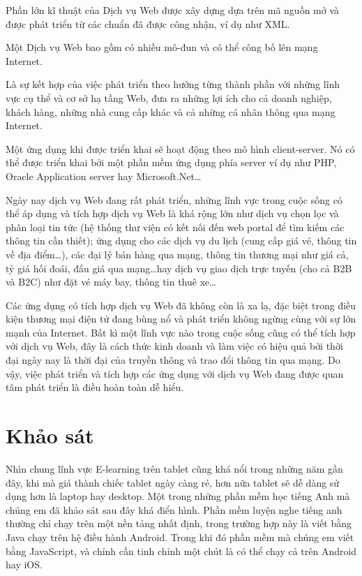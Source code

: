 Phần lớn kĩ thuật của Dịch vụ Web được xây dựng dựa trên mã nguồn mở và được phát triển từ các chuẩn đã được công nhận, ví dụ như XML.

Một Dịch vụ Web bao gồm có nhiều mô-đun và có thể công bố lên mạng Internet.

Là sự kết hợp của việc phát triển theo hướng từng thành phần với những lĩnh vực cụ thể và cơ sở hạ tầng Web, đưa ra những lợi ích cho cả doanh nghiệp, khách hàng, những nhà cung cấp khác và cả những cá nhân thông qua mạng Internet.

Một ứng dụng khi được triển khai sẽ hoạt động theo mô hình client-server. Nó có thể được triển khai bởi một phần mềm ứng dụng phía server ví dụ như PHP, Oracle Application server hay Microsoft.Net…

Ngày nay dịch vụ Web đang rất phát triển, những lĩnh vực trong cuộc sống có thể áp dụng và tích hợp dịch vụ Web là khá rộng lớn như dịch vụ chọn lọc và phân loại tin tức (hệ thống thư viện có kết nối đến web portal để tìm kiếm các thông tin cần thiết); ứng dụng cho các dịch vụ du lịch (cung cấp giá vé, thông tin về địa điểm…), các đại lý bán hàng qua mạng, thông tin thương mại như giá cả, tỷ giá hối đoái, đấu giá qua mạng…hay dịch vụ giao dịch trực tuyến (cho cả B2B và B2C) như đặt vé máy bay, thông tin thuê xe…

Các ứng dụng có tích hợp dịch vụ Web đã không còn là xa lạ, đặc biệt trong điều kiện thương mại điện tử đang bùng nổ và phát triển không ngừng cùng với sự lớn mạnh của Internet. Bất kì một lĩnh vực nào trong cuộc sống cũng có thể tích hợp với dịch vụ Web, đây là cách thức kinh doanh và làm việc có hiệu quả bởi thời đại ngày nay là thời đại của truyền thông và trao đổi thông tin qua mạng. Do vậy, việc phát triển và tích hợp các ứng dụng với dịch vụ Web đang được quan tâm phát triển là điều hoàn toàn dễ hiểu.

\section{Khảo sát}

Nhìn chung lĩnh vực E-learning trên tablet cũng khá nổi trong những năm gần đây, khi mà giá thành chiếc tablet ngày càng rẻ, hơn nữa tablet sẽ dễ dàng sử dụng hơn là laptop hay desktop. Một trong những phần mềm học tiếng Anh mà chúng em đã khảo sát sau đây khá điển hình. Phần mềm luyện nghe tiếng anh thường chỉ chạy trên một nền tảng nhất định, trong trường hợp này là viết bằng Java chạy trên hệ điều hành Android. Trong khi đó phần mềm mà chúng em viết bằng JavaScript, và chỉnh cần tinh chỉnh một chút là có thể chạy cả trên Android hay iOS.
